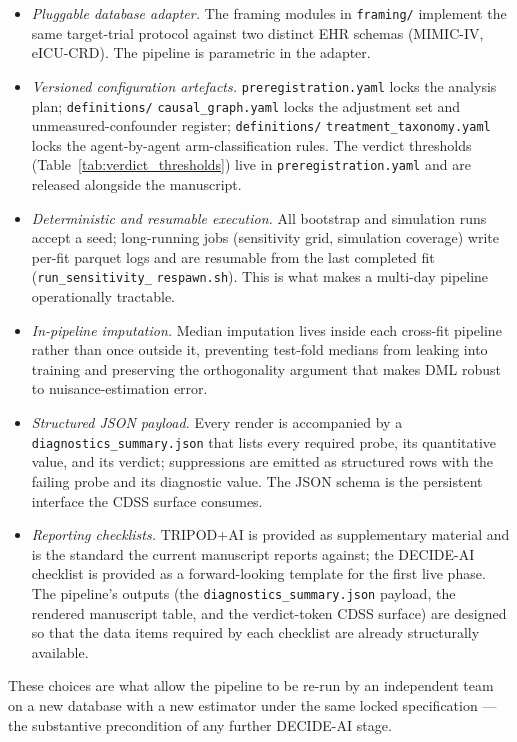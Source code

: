 \documentclass[11pt,a4paper]{article}
\begin{document}
\begin{itemize}[leftmargin=*,itemsep=2pt]
\item \emph{Pluggable database adapter.} The framing modules in \texttt{framing/} implement the same target-trial protocol against two distinct EHR schemas (MIMIC-IV, eICU-CRD). The pipeline is parametric in the adapter.
\item \emph{Versioned configuration artefacts.} \texttt{preregistration.yaml} locks the analysis plan; \texttt{definitions/} \texttt{causal\_graph.yaml} locks the adjustment set and unmeasured-confounder register; \texttt{definitions/} \texttt{treatment\_taxonomy.yaml} locks the agent-by-agent arm-classification rules. The verdict thresholds (Table~\ref{tab:verdict_thresholds}) live in \texttt{preregistration.yaml} and are released alongside the manuscript.
\item \emph{Deterministic and resumable execution.} All bootstrap and simulation runs accept a seed; long-running jobs (sensitivity grid, simulation coverage) write per-fit parquet logs and are resumable from the last completed fit (\texttt{run\_sensitivity\_} \texttt{respawn.sh}). This is what makes a multi-day pipeline operationally tractable.
\item \emph{In-pipeline imputation.} Median imputation lives inside each cross-fit pipeline rather than once outside it, preventing test-fold medians from leaking into training and preserving the orthogonality argument that makes DML robust to nuisance-estimation error.
\item \emph{Structured JSON payload.} Every render is accompanied by a \texttt{diagnostics\_summary.json} that lists every required probe, its quantitative value, and its verdict; suppressions are emitted as structured rows with the failing probe and its diagnostic value. The JSON schema is the persistent interface the CDSS surface consumes.
\item \emph{Reporting checklists.} TRIPOD+AI \cite{tripodai2024} is provided as supplementary material and is the standard the current manuscript reports against; the DECIDE-AI \cite{decideai2022} checklist is provided as a forward-looking template for the first live phase. The pipeline's outputs (the \texttt{diagnostics\_summary.json} payload, the rendered manuscript table, and the verdict-token CDSS surface) are designed so that the data items required by each checklist are already structurally available.
\end{itemize}

These choices are what allow the pipeline to be re-run by an independent team on a new database with a new estimator under the same locked specification --- the substantive precondition of any further DECIDE-AI stage.
\end{document}
